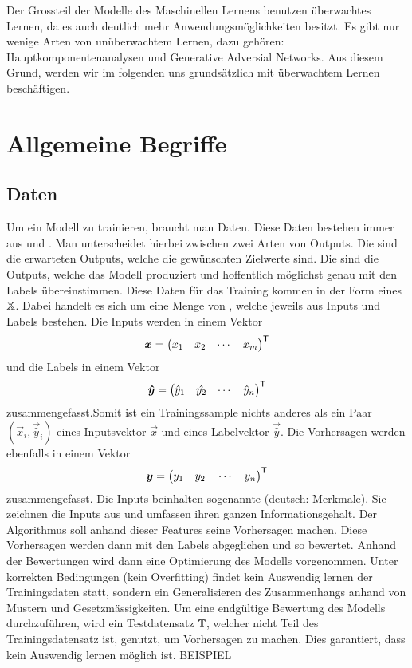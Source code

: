 Der Grossteil der Modelle des Maschinellen Lernens benutzen überwachtes
Lernen, da es auch deutlich mehr Anwendungsmöglichkeiten besitzt. Es gibt nur wenige Arten von
unüberwachtem Lernen, dazu gehören: Hauptkomponentenanalysen und Generative
Adversial Networks. Aus diesem Grund, werden wir im folgenden uns grundsätzlich
mit überwachtem Lernen beschäftigen.
\para{}
\cite{wiki:supervised_learning}
\cite{wiki:unsupervised_learning}

\section{Allgemeine Begriffe}

\subsection{Daten}

Um ein Modell zu trainieren, braucht man Daten. Diese Daten bestehen immer aus
 und . Man unterscheidet hierbei zwischen zwei Arten
von Outputs. Die  sind die erwarteten Outputs, welche die
gewünschten Zielwerte sind. Die  sind die Outputs, welche
das Modell produziert und hoffentlich möglichst genau mit den Labels
übereinstimmen.
\para{}
Diese Daten für das Training kommen in der Form eines  $\mathbb{X}$.
Dabei handelt es sich um eine Menge von ,
welche jeweils aus Inputs und Labels bestehen.
Die Inputs werden in einem Vektor
\[ \bm{x} = \begin{pmatrix} x_1 & x_2 & \cdots & x_m \end{pmatrix}^{\mathsf{T}} \]
und die Labels in einem Vektor
\[ \bm{\hat{y}} = \begin{pmatrix} \hat{y}_1 & \hat{y_2} & \cdots & \hat{y}_n \end{pmatrix}^{\mathsf{T}} \]
zusammengefasst.Somit ist ein Trainingssample nichts anderes als ein Paar
$(\vec{x}_i,\vec{\hat{y}}_i)$ eines Inputsvektor $\vec{x}$ und eines Labelvektor
$\vec{\hat{y}}$.
Die Vorhersagen werden ebenfalls in einem Vektor
\[\bm{y} = \begin{pmatrix} y_1 \quad y_2 \quad \cdots \quad y_n \end{pmatrix}^{\mathsf{T}} \]
zusammengefasst.
\para{}
Die Inputs beinhalten sogenannte  (deutsch: Merkmale). Sie
zeichnen die Inputs aus und umfassen ihren ganzen Informationsgehalt.
Der Algorithmus soll
anhand dieser Features seine Vorhersagen machen.
Diese Vorhersagen werden dann mit den Labels abgeglichen und so bewertet.
Anhand der Bewertungen wird dann eine Optimierung des Modells vorgenommen.
Unter korrekten Bedingungen (kein Overfitting) findet kein Auswendig lernen der Trainingsdaten statt,
sondern ein Generalisieren des Zusammenhangs anhand von Mustern und Gesetzmässigkeiten.
\para{}
Um eine endgültige Bewertung des Modells durchzuführen, wird ein Testdatensatz
$\mathbb{T}$, welcher nicht Teil des Trainingsdatensatz ist, genutzt, um Vorhersagen zu machen.
Dies garantiert, dass kein Auswendig lernen möglich ist.
\para{}
BEISPIEL


